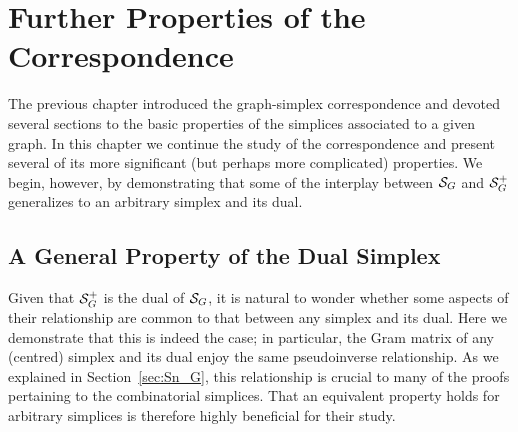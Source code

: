 \chapter{Further Properties of the Correspondence}
\label{chap:further_properties}


The previous chapter introduced the graph-simplex correspondence and devoted several sections to the basic properties of the simplices associated to a given graph. In this chapter we  continue the study of the correspondence and present several of its more significant (but perhaps more complicated) properties.  We begin,  however, by demonstrating that  some of the interplay between $\mathcal{S}_G$ and $\mathcal{S}_G^+$ generalizes to an arbitrary simplex and its dual. 

\section{A General Property of the Dual Simplex }
Given that $\mathcal{S}_G^+$  is the dual of $\mathcal{S}_G$, it is natural to wonder whether some aspects of  their relationship are common to that between any simplex and its dual.  
Here we demonstrate that this is indeed the case; in particular, the Gram matrix of any (centred) simplex and its dual enjoy  the same pseudoinverse relationship. 
As we explained in Section~\ref{sec:Sn_G}, this relationship  is crucial to many of the proofs pertaining to  the combinatorial  simplices.
That  an equivalent property  holds for arbitrary simplices is therefore highly beneficial for their  study. 

